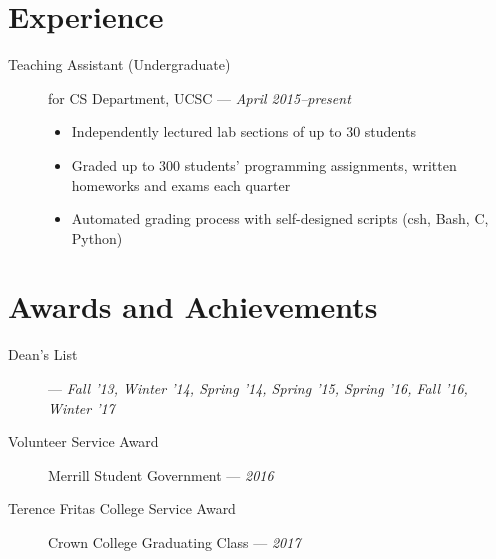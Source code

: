 \documentclass[10pt]{article}
\begin{document}
\section*{Experience}
\begin{description}
  \item[Teaching Assistant (Undergraduate)] for CS Department, UCSC ---
    \textit{April 2015--present}
    \begin{itemize}
      \item Independently lectured lab sections of up to $30$ students
      \item Graded up to $300$ students' programming assignments, written
        homeworks and exams each quarter
      \item Automated grading process with self-designed scripts (csh, Bash, C,
        Python)
    \end{itemize}
\end{description}

\section*{Awards and Achievements}
\begin{description}
  \item[Dean's List] --- \textit{Fall '13, Winter '14, Spring '14, Spring '15,
    Spring '16, Fall '16, Winter '17}
\item[Volunteer Service Award] Merrill Student Government --- \textit{2016}
\item[Terence Fritas College Service Award] Crown College Graduating Class --- \textit{2017}
\end{description}
\end{document}
